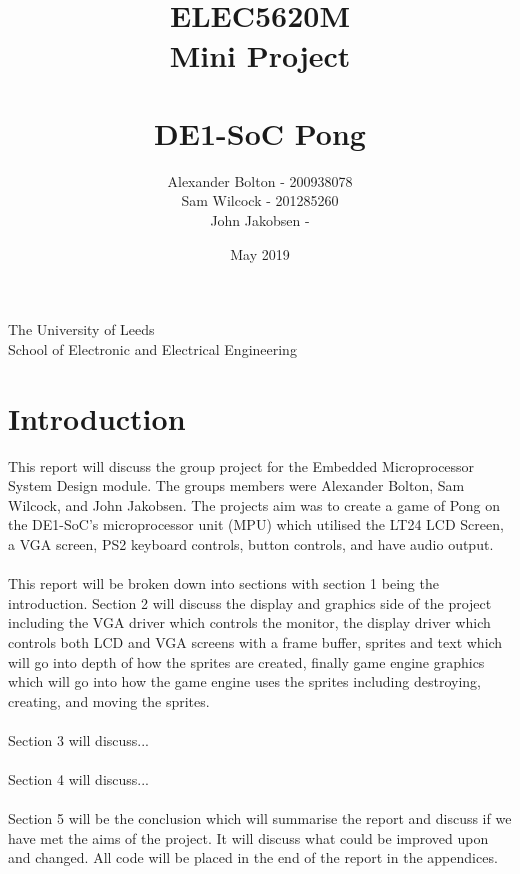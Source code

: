 \documentclass[a4paper,12pt]{article}
\begin{document}
\title{\\ \textbf{ELEC5620M \\ Mini Project \\ \- \\ DE1-SoC Pong }}
\author{Alexander Bolton - 200938078 \\ Sam Wilcock - 201285260\\ John Jakobsen - }
\date{May 2019}
\maketitle
\thispagestyle{empty}
\begin{center}

\end{center}
\vfill
\begin{center}
The University of Leeds \\  School of Electronic and Electrical Engineering
\end{center}

\newpage

\tableofcontents
\thispagestyle{empty}

\newpage 
{}
\section{Introduction}
\begin{flushleft}
This report will discuss the group project for the Embedded Microprocessor System Design module. The groups members were Alexander Bolton, Sam Wilcock, and John Jakobsen. The projects aim was to create a game of Pong on the DE1-SoC's microprocessor unit (MPU) which utilised the LT24 LCD Screen, a VGA screen, PS2 keyboard controls, button controls, and have audio output.
\\ \- \\
This report will be broken down into sections with section 1 being the introduction. Section 2 will discuss the display and graphics side of the project including the VGA driver which controls the monitor, the display driver which controls both LCD and VGA screens with a frame buffer, sprites and text which will go into depth of how the sprites are created, finally game engine graphics which will go into how the game engine uses the sprites including destroying, creating, and moving the sprites. 
\\ \- \\
Section 3 will discuss...
\\ \- \\
Section 4 will discuss...
\\ \- \\
Section 5 will be the conclusion which will summarise the report and discuss if we have met the aims of the project. It will discuss what could be improved upon and changed. All code will be placed in the end of the report in the appendices. 
\end{flushleft}
\newpage
\end{document}
